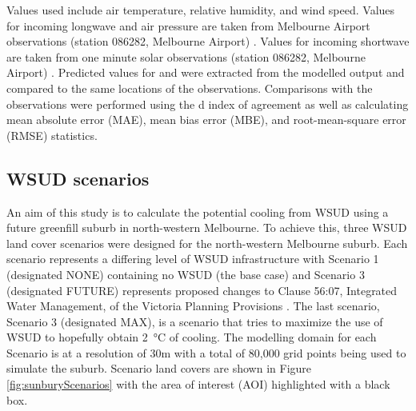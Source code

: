\documentclass[final,3p,times,authoryear]{elsarticle}
\begin{document}
Values used include air temperature, relative humidity, and wind speed. Values for incoming longwave and air pressure are taken from Melbourne Airport observations (station 086282, Melbourne Airport) \citep{BOM2016b}. Values for incoming shortwave are taken from one minute solar observations (station 086282, Melbourne Airport) \citep{BOM2016}. Predicted values for  and  were extracted from the modelled output and compared to the same locations of the observations. Comparisons with the observations were performed using the \cite{Willmott1981} d index of agreement as well as calculating mean absolute error (MAE), mean bias error (MBE), and root-mean-square error (RMSE) statistics.






\subsection{WSUD scenarios}\label{sec:methods_wsudscenarios}
An aim of this study is to calculate the potential cooling from WSUD using a future greenfill suburb in north-western Melbourne. To achieve this, three WSUD land cover scenarios were designed for the north-western Melbourne suburb. Each scenario represents a differing level of WSUD infrastructure with Scenario 1 (designated NONE) containing no WSUD (the base case) and Scenario 3 (designated FUTURE) represents proposed changes to Clause 56:07, Integrated Water Management, of the Victoria Planning Provisions \citep{VictoriaStateGovernment2018}. The last scenario, Scenario 3 (designated MAX), is a scenario that tries to maximize the use of WSUD to hopefully obtain 2\SI{}{\degreeCelsius} of cooling. The modelling domain for each Scenario is at a resolution of 30m with a total of 80,000 grid points being used to simulate the suburb. Scenario land covers are shown in Figure \ref{fig:sunburyScenarios} with the area of interest (AOI) highlighted with a black box. 
\end{document}
